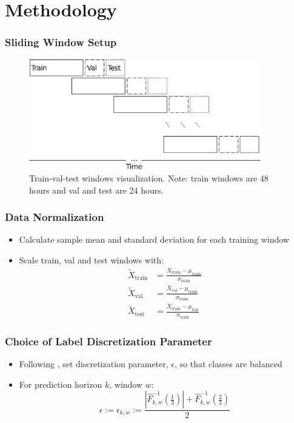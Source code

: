\documentclass[handout]{beamer}
\begin{document}
\section{Methodology}
\begin{frame}
    \frametitle{Sliding Window Setup}
    \begin{figure}[htpb]
        \centering
        \includegraphics[width=0.9\textwidth]{./images/sliding_window.pdf}
        \caption{Train-val-test windows visualization. Note: train windows are 48 hours and val and test are 24 hours.}
    \end{figure}
\end{frame}

\begin{frame}
    \frametitle{Data Normalization}
     \begin{itemize}
        \item Calculate sample mean and standard deviation for each training window
        \item Scale train, val and test windows with:
            \begin{equation*}
                \begin{aligned}
                    \tilde{X}_{\text{train}} &= \frac{X_{\text{train}} - \mu_{\text{train}}}{\sigma_{\text{train}}} \\
                    \tilde{X}_{\text{val}} &= \frac{X_{\text{val}} - \mu_{\text{train}}}{\sigma_{\text{train}}} \\
                    \tilde{X}_{\text{test}} &= \frac{X_{\text{train}} - \mu_{\text{test}}}{\sigma_{\text{train}}}
                \end{aligned}
            \end{equation*}
    \end{itemize}
    
\end{frame}

\begin{frame}
    \frametitle{Choice of Label Discretization Parameter}
     \begin{itemize}
         \item Following {\color{blue}\cite{LUCCHESE2024}}, set discretization parameter, $\epsilon$, so that classes are balanced
        \item For prediction horizon $k$, window $w$:
        \begin{equation}
            \epsilon := \epsilon_{k, w} := \frac{|\hat{F}_{k, w}^{-1}(\frac{1}{3})| + \hat{F}_{k, w}^{-1}(\frac{2}{3})}{2}
        \end{equation}
    \end{itemize}
\end{frame}
\end{document}
